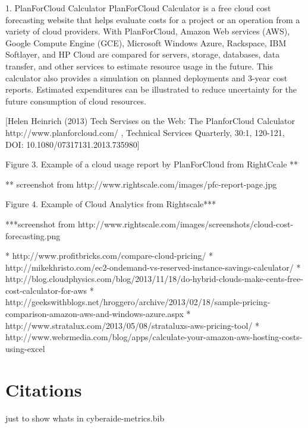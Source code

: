 \documentclass{sig-alternate}
\begin{document}
1. PlanForCloud Calculator
PlanForCloud Calculator is a free cloud cost forecasting website that
helps evaluate costs for a project or an operation from a variety of
cloud providers. With PlanForCloud, Amazon Web services (AWS), Google
Compute Engine (GCE), Microsoft Windows Azure, Rackspace, IBM
Softlayer, and HP Cloud are compared for servers, storage, databases,
data transfer, and other services to estimate resource usage in the
future. This calculator also provides a simulation on planned
deployments and 3-year cost reports. Estimated expenditures can be
illustrated to reduce uncertainty for the future consumption of cloud
resources. 


[Helen Heinrich (2013) Tech Servises on the Web: The PlanforCloud
Calculator http://www.planforcloud.com/ , Technical Services Quarterly, 30:1, 120-121, DOI:
10.1080/07317131.2013.735980]

 
Figure 3. Example of a cloud usage report by PlanForCloud from RightCcale **

** screenshot from http://www.rightscale.com/images/pfc-report-page.jpg


 
Figure 4. Example of Cloud Analytics from Rightscale***

***screenshot from http://www.rightscale.com/images/screenshots/cloud-cost-forecasting.png

*	http://www.profitbricks.com/compare-cloud-pricing/
*	http://mikekhristo.com/ec2-ondemand-vs-reserved-instance-savings-calculator/
*	http://blog.cloudphysics.com/blog/2013/11/18/do-hybrid-clouds-make-cents-free-cost-calculator-for-aws
*	http://geekswithblogs.net/hroggero/archive/2013/02/18/sample-pricing-comparison-amazon-aws-and-windows-azure.aspx
*	http://www.stratalux.com/2013/05/08/strataluxs-aws-pricing-tool/
*	http://www.webrmedia.com/blog/apps/calculate-your-amazon-aws-hosting-costs-using-excel

\section{Citations}

just to show whats in cyberaide-metrics.bib

 
\end{document}

